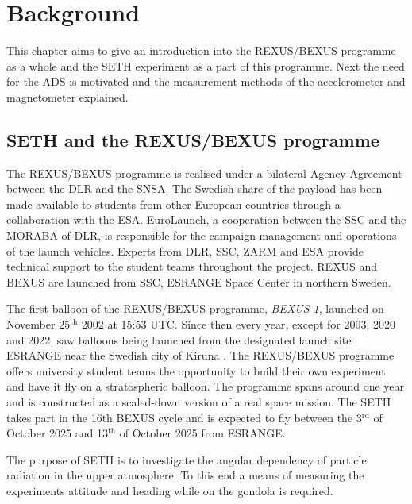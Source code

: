 \chapter{Background \label{ch:background}}
This chapter aims to give an introduction into the \acf{REXUS}/\acf{BEXUS} programme as a whole and the \acf{SETH} experiment as a part of this programme. Next the need for the \acf{ADS} is motivated and the measurement methods of the accelerometer and magnetometer explained.

\section{\acs{SETH} and the \acs{REXUS}/\acs{BEXUS} programme \label{sec:bg:seth_and_bx_programme}}

The \acs{REXUS}/\acs{BEXUS} programme is realised under a bilateral Agency Agreement between the \acf{DLR} and the \acf{SNSA}. The Swedish share of the payload has been made available to students from other European countries through a collaboration with the \acf{ESA}. EuroLaunch, a cooperation between the \acf{SSC} and the \acf{MORABA} of \acs{DLR}, is responsible for the campaign management and operations of the launch vehicles. Experts from \acs{DLR}, \acs{SSC}, \acs{ZARM} and \acs{ESA} provide technical support to the student teams throughout the project. \acs{REXUS} and \acs{BEXUS} are launched from \acs{SSC}, \acs{ESRANGE} Space Center in northern Sweden.


The first balloon of the \ac{REXUS}/\ac{BEXUS} programme, \textit{BEXUS 1}, launched on November 25$^{\mathrm{th}}$ 2002 at 15:53 UTC. Since then every year, except for 2003, 2020 and 2022, saw balloons being launched from the designated launch site \ac{ESRANGE} near the Swedish city of Kiruna \cite{IAC-08.E.1.1.4}\cite{bexus-campaign-history}.
The \ac{REXUS}/\ac{BEXUS} programme offers university student teams the opportunity to build their own experiment and have it fly on a stratospheric balloon. The programme spans around one year and is constructed as a scaled-down version of a real space mission. The \ac{SETH} takes part in the 16th \ac{BEXUS} cycle and is expected to fly between the 3$^\mathrm{rd}$ of October 2025 and 13$^\mathrm{th}$ of October 2025 from \ac{ESRANGE}.

The purpose of \ac{SETH} is to investigate the angular dependency of particle radiation in the upper atmosphere. To this end a means of measuring the experiments attitude and heading while on the gondola is required.

